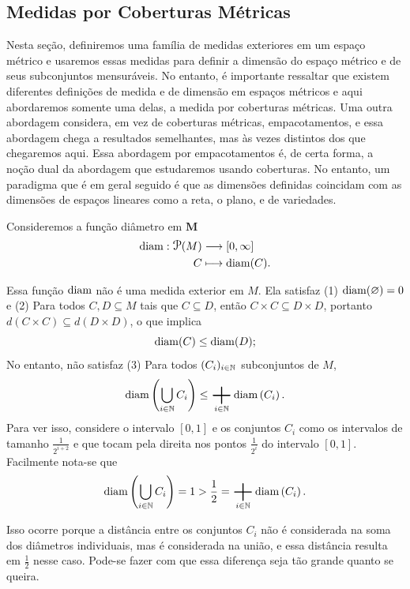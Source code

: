 
\subsection{Medidas por Coberturas Métricas}

Nesta seção, definiremos uma família de medidas exteriores em um espaço métrico e usaremos essas medidas para definir a dimensão do espaço métrico e de seus subconjuntos mensuráveis. No entanto, é importante ressaltar que existem diferentes definições de medida e de dimensão em espaços métricos e aqui abordaremos somente uma delas, a medida por coberturas métricas. Uma outra abordagem considera, em vez de coberturas métricas, empacotamentos, e essa abordagem chega a resultados semelhantes, mas às vezes distintos dos que chegaremos aqui. Essa abordagem por empacotamentos é, de certa forma, a noção dual da abordagem que estudaremos usando coberturas. No entanto, um paradigma que é em geral seguido é que as dimensões definidas coincidam com as dimensões de espaços lineares como a reta, o plano, e de variedades.

Consideremos a função diâmetro em $\bm M$
	\begin{align*}
	\func{\diam}{\p(M)}{[0,\infty]}{C}{\diam(C)}.
	\end{align*}

Essa função $\operatorname{diam}$ não é uma medida exterior em $M$. Ela satisfaz (1) $\operatorname{diam}(\varnothing)=0$ e (2) Para todos $C,D \subseteq M$ tais que $C \subseteq D$, então $C \times C \subseteq D \times D$, portanto $d(C \times C) \subseteq d(D \times D)$, o que implica
	\begin{equation*}
	\operatorname{diam}(C) \leq \operatorname{diam}(D);
	\end{equation*}
No entanto, não satisfaz 
(3) Para todos $(C_i)_{i \in \mathbb{N}}$ subconjuntos de $M$,
	\begin{equation*}
	\diam\left( \bigcup_{i \in \N} C_i \right) \leq \sum_{i \in \N} \diam\left( C_i \right).
	\end{equation*}
Para ver isso, considere o intervalo $[0,1]$ e os conjuntos $C_i$ como os intervalos de tamanho $\frac{1}{2^{i+2}}$ e que tocam pela direita nos pontos $\frac{1}{2^i}$ do intervalo $[0,1]$. Facilmente nota-se que
	\begin{equation*}
	\diam\left( \bigcup_{i \in \N} C_i \right) = 1 > \frac{1}{2} = \sum_{i \in \N} \diam\left( C_i \right).
	\end{equation*}

Isso ocorre porque a distância entre os conjuntos $C_i$ não é considerada na soma dos diâmetros individuais, mas é considerada na união, e essa distância resulta em $\frac{1}{2}$ nesse caso. Pode-se fazer com que essa diferença seja tão grande quanto se queira.

